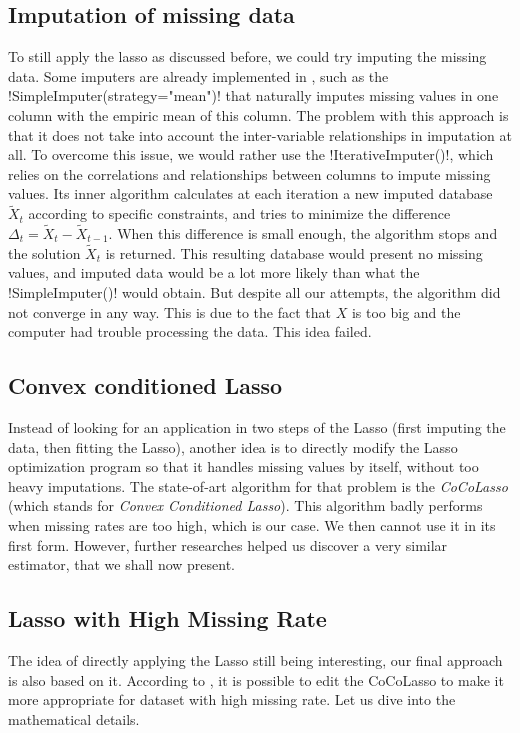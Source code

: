 \documentclass[]{article}
\begin{document}
\subsection{Imputation of missing data}
To still apply the lasso as discussed before, we could try imputing the missing data. Some imputers are already implemented in \sklearn, such as the \pyth!SimpleImputer(strategy="mean")! that naturally imputes missing values in one column with the empiric mean of this column. The problem with this approach is that it does not take into account the inter-variable relationships in imputation at all. To overcome this issue, we would rather use the \pyth!IterativeImputer()!, which relies on the correlations and relationships between columns to impute missing values. Its inner algorithm calculates at each iteration a new imputed database $\tilde{X}_t$ according to specific constraints, and tries to minimize the difference $\Delta_t = \tilde{X}_{t} - \tilde{X}_{t-1}$. When this difference is small enough, the algorithm stops and the solution $\tilde{X}_t$ is returned. This resulting database would present no missing values, and imputed data would be a lot more likely than what the \pyth!SimpleImputer()! would obtain. But despite all our attempts, the algorithm did not converge in any way. This is due to the fact that $X$ is too big and the computer had trouble processing the data. This idea failed.

\subsection{Convex conditioned Lasso}
Instead of looking for an application in two steps of the Lasso (first imputing the data, then fitting the Lasso), another idea is to directly modify the Lasso optimization program so that it handles missing values by itself, without too heavy imputations. The state-of-art algorithm for that problem is the \textit{CoCoLasso} (which stands for \textit{Convex Conditioned Lasso}). This algorithm badly performs when missing rates are too high, which is our case. We then cannot use it in its first form. However, further researches helped us discover a very similar estimator, that we shall now present.

\subsection{Lasso with High Missing Rate}
The idea of directly applying the Lasso still being interesting, our final approach is also based on it. According to 
\cite{hmlasso2019}, it is possible to edit the CoCoLasso to make it more appropriate for dataset with high missing rate. Let us dive into the mathematical details.\\
\end{document}
